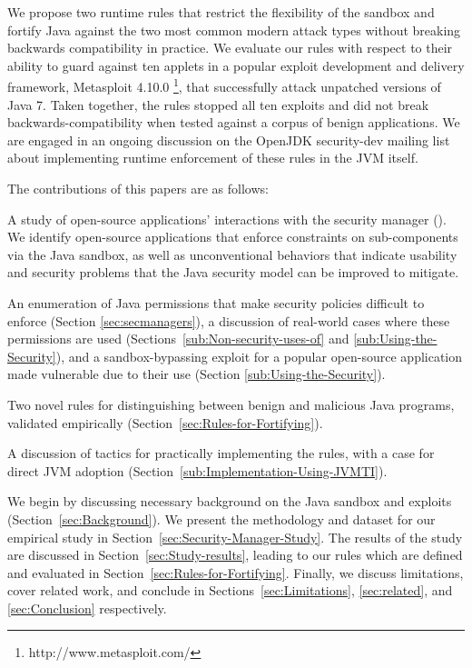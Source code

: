 \documentclass{sig-alternate-05-2015}
\begin{document}
We propose
two runtime rules that restrict the flexibility of the sandbox and fortify Java
against the two most common modern attack types without breaking backwards
compatibility in practice. We evaluate our rules
with respect to their ability to guard against ten applets in a popular exploit development
and delivery framework, Metasploit
4.10.0%
\footnote{http://www.metasploit.com/}, that successfully attack unpatched
versions of Java 7.
Taken together, the rules stopped all ten exploits and did not break
backwards-compatibility
when tested against a corpus of benign applications.
We are engaged in an
ongoing discussion on the OpenJDK security-dev mailing list about
implementing runtime enforcement of these rules in the JVM itself.


The contributions of this papers are as follows:
\begin{flushitem} \setlength{\parskip}{0pt}
\setlength{\parsep}{0pt}
\setlength{\itemsep}{0pt}
\item A study of open-source applications' interactions with the security
manager ().  We identify open-source applications that
enforce constraints on sub-components via the Java sandbox,
as well as unconventional behaviors that indicate usability and security problems that the Java
security model can be improved to mitigate. 
\item An enumeration of Java permissions that make security policies difficult
to enforce (Section \ref{sec:secmanagers}), a discussion of real-world cases
where these permissions are used (Sections~\ref{sub:Non-security-uses-of} and
\ref{sub:Using-the-Security}), and a sandbox-bypassing exploit for a popular
open-source application made vulnerable due to their use (Section
\ref{sub:Using-the-Security}).
\item Two novel rules for distinguishing between benign and malicious Java
programs, validated empirically (Section~\ref{sec:Rules-for-Fortifying}).
\item A discussion of tactics for practically implementing the
rules, with a case for direct JVM adoption (Section~\ref{sub:Implementation-Using-JVMTI}).
\end{flushitem}

We begin by discussing necessary background on the Java sandbox and exploits
(Section~\ref{sec:Background}).  We present the methodology and  
dataset for our empirical study in Section~\ref{sec:Security-Manager-Study}. The
results of the study are discussed in  
Section~\ref{sec:Study-results}, leading to our rules which are defined and evaluated in 
Section~\ref{sec:Rules-for-Fortifying}. Finally, we discuss limitations, cover 
related work, and conclude in Sections~\ref{sec:Limitations}, \ref{sec:related}, and 
\ref{sec:Conclusion} respectively.
\end{document}
